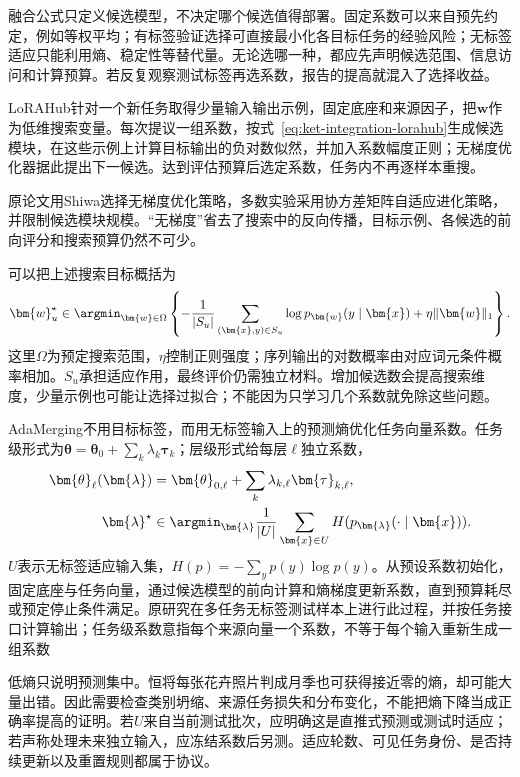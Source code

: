 融合公式只定义候选模型，不决定哪个候选值得部署。固定系数可以来自预先约定，例如等权平均；有标签验证选择可直接最小化各目标任务的经验风险；无标签适应只能利用熵、稳定性等替代量。无论选哪一种，都应先声明候选范围、信息访问和计算预算。若反复观察测试标签再选系数，报告的提高就混入了选择收益。

LoRAHub针对一个新任务取得少量输入输出示例，固定底座和来源因子，把$\bm{w}$作为低维搜索变量。每次提议一组系数，按式~\eqref{eq:ket-integration-lorahub}生成候选模块，在这些示例上计算目标输出的负对数似然，并加入系数幅度正则；无梯度优化器据此提出下一候选。达到评估预算后选定系数，任务内不再逐样本重搜。

原论文用Shiwa选择无梯度优化策略，多数实验采用协方差矩阵自适应进化策略，并限制候选模块规模。“无梯度”省去了搜索中的反向传播，目标示例、各候选的前向评分和搜索预算仍然不可少。

可以把上述搜索目标概括为
\begin{equation}
  \bm{w}_u^\star\in\argmin_{\bm{w}\in\Omega}
   \left\{-\frac{1}{|S_u|}
   \sum_{(\bm{x},y)\in S_u}\log p_{\bm{w}}(y\mid\bm{x})
   +\eta\lVert\bm{w}\rVert_1\right\}.
  \label{eq:ket-integration-lorahub-search}
\end{equation}
这里$\Omega$为预定搜索范围，$\eta$控制正则强度；序列输出的对数概率由对应词元条件概率相加。$S_u$承担适应作用，最终评价仍需独立材料。增加候选数会提高搜索维度，少量示例也可能让选择过拟合；不能因为只学习几个系数就免除这些问题。

AdaMerging不用目标标签，而用无标签输入上的预测熵优化任务向量系数。任务级形式为$\bm{\theta}=\bm{\theta}_0+\sum_k\lambda_k\bm{\tau}_k$；层级形式给每层$\ell$独立系数，
\begin{equation}
  \begin{aligned}
    \bm{\theta}_{\ell}(\bm{\lambda})
      &=\bm{\theta}_{0,\ell}+\sum_k\lambda_{k,\ell}\bm{\tau}_{k,\ell},\\
    \bm{\lambda}^{\star}
      &\in\argmin_{\bm{\lambda}}\frac{1}{|U|}
        \sum_{\bm{x}\in U}H(p_{\bm{\lambda}}(\cdot\mid\bm{x})).
  \end{aligned}
  \label{eq:ket-integration-adamerging}
\end{equation}
$U$表示无标签适应输入集，$H(p)=-\sum_y p(y)\log p(y)$。从预设系数初始化，固定底座与任务向量，通过候选模型的前向计算和熵梯度更新系数，直到预算耗尽或预定停止条件满足。原研究在多任务无标签测试样本上进行此过程，并按任务接口计算输出；任务级系数意指每个来源向量一个系数，不等于每个输入重新生成一组系数

低熵只说明预测集中。恒将每张花卉照片判成月季也可获得接近零的熵，却可能大量出错。因此需要检查类别坍缩、来源任务损失和分布变化，不能把熵下降当成正确率提高的证明。若$U$来自当前测试批次，应明确这是直推式预测或测试时适应；若声称处理未来独立输入，应冻结系数后另测。适应轮数、可见任务身份、是否持续更新以及重置规则都属于协议。

